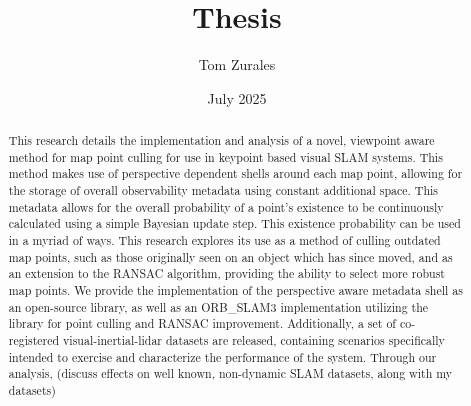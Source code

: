 \documentclass[25pt]{article}
\title{Thesis}
\author{Tom Zurales}
\date{July 2025}
\begin{document}
\doublespace

\maketitle

\newpage

\begin{abstract}
  This research details the implementation and analysis of a novel, viewpoint aware method for map point culling for use in keypoint based visual SLAM systems. This method makes use of perspective dependent shells around each map point, allowing for the storage of overall observability metadata using constant additional space. This metadata allows for the overall probability of a point's existence to be continuously calculated using a simple Bayesian update step. This existence probability can be used in a myriad of ways. This research explores its use as a method of culling outdated map points, such as those originally seen on an object which has since moved, and as an extension to the RANSAC algorithm, providing the ability to select more robust map points. We provide the implementation of the perspective aware metadata shell as an open-source library, as well as an ORB\_SLAM3 implementation utilizing the library for point culling and RANSAC improvement. Additionally, a set of co-registered visual-inertial-lidar datasets are released, containing scenarios specifically intended to exercise and characterize the performance of the system. Through our analysis, (discuss effects on well known, non-dynamic SLAM datasets, along with my datasets)
\end{abstract}

\newpage

\tableofcontents

\newpage

\listoffigures















\printbibliography


\end{document}
